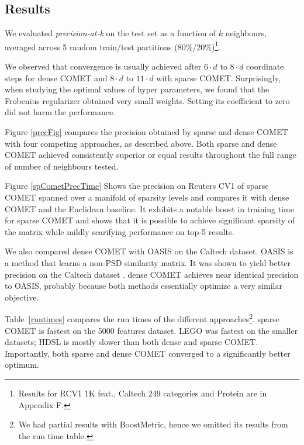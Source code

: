 \documentclass[twoside,11pt]{article}
\newcommand{\ignore}[1]{}
\newcommand{\tabref}[1]{Table~\ref{#1}}
\begin{document}
\subsection{Results}
We evaluated \textit{precision-at-k} on the test set as a function of $k$ neighbours, averaged across 5 random train/test partitions (80\%/20\%)\footnote{Results for RCV1 1K feat., Caltech 249 categories and Protein are in Appendix F.}.
\ignore{Figure \ref{cometConvergeFig} shows the \textit{precision-at-k} over the test sets as it progresses during learning. 
}
We observed that convergence is usually achieved after $6 \cdot d$ to $8 \cdot d$ coordinate steps for dense COMET and $8 \cdot d$ to $11 \cdot d$ with sparse COMET.
Surprisingly, when studying the optimal values of hyper parameters, we found that the Frobenius regularizer obtained very small weights. Setting its coefficient to zero did not harm the performance. 

Figure \ref{precFig} compares the precision obtained by sparse and dense COMET with four competing approaches, as described above. Both sparse and dense COMET achieved consistently superior or equal results throughout the full range of number of neighbours tested.

Figure \ref{spCometPrecTime} Shows the precision on Reuters CV1 of sparse COMET spanned over a manifold of sparsity levels and compares it with dense COMET and the Euclidean baseline. It exhibits a notable boost in training time for sparse COMET and shows that it is possible to achieve significant sparsity of the matrix while mildly scarifying performance on top-5 results.

We also compared dense COMET with OASIS on the Caltech dataset. OASIS is a method that learns a non-PSD similarity matrix. It was shown to yield better precision on the Caltech dataset \citep{OASIS}. dense COMET achieves near identical precision to OASIS, probably because both methods essentially optimize a very similar objective.


\tabref{runtimes} compares the run times of the different approaches\footnote{We had partial results with BoostMetric, hence we omitted its results from the run time table.}. sparse COMET is fastest on the 5000 features dataset. LEGO was fastest on the smaller datasets; HDSL is mostly slower than both dense and sparse COMET. Importantly, both sparse and dense COMET converged to a significantly better optimum.
\end{document}
